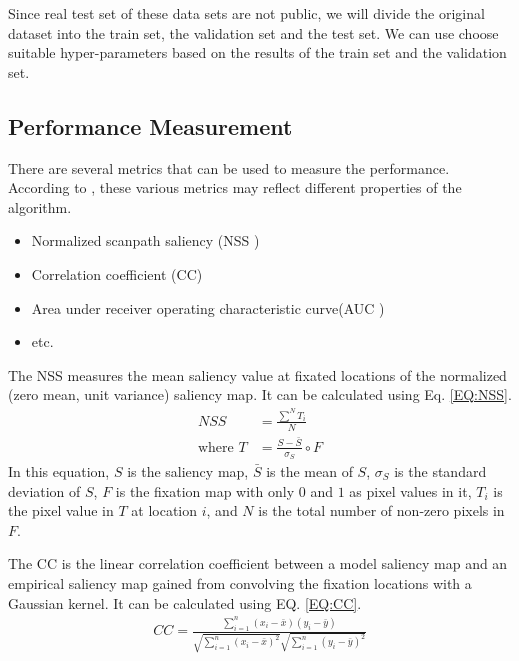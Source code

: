 \documentclass[12pt]{article}
\begin{document}
Since real test set of these data sets are not public, we will divide the original dataset into the train set, the validation set and the test set. We can use choose suitable hyper-parameters based on the results of the train set and the validation set.
\subsection{Performance Measurement}

There are several metrics that can be used to measure the performance. According to \cite{riche2013saliency}, these various metrics may reflect different properties of the algorithm.
\begin{itemize}
    \item Normalized scanpath saliency (NSS \cite{petersComponentsBottomupGaze2005})
    \item Correlation coefficient (CC)
    \item Area under receiver operating characteristic curve(AUC \cite{richeSaliencyHumanFixations2013})
    \item etc.
\end{itemize}

The NSS measures the mean saliency value at fixated locations of the normalized (zero mean, unit variance) saliency map. 
It can be calculated using Eq. \ref{EQ:NSS}. 
\begin{equation}
    \begin{aligned}
        NSS &= \frac{\sum^{N} T_{i}}{N}\\
        \text{where }T &= \frac{S - \bar{S}}{\sigma_{S}} \circ F
    \end{aligned}
    \label{EQ:NSS}
\end{equation}
In this equation, $S$ is the saliency map, $\bar{S}$ is the mean of $S$, $\sigma_{S}$ is 
the standard deviation of $S$, $F$ is the fixation map with only $0$ and $1$ as pixel values in it,
$T_{i}$ is the pixel value in $T$ at location $i$, and $N$ is the total number of non-zero pixels in $F$.

The CC is the linear correlation coefficient between a model saliency map and an empirical saliency map 
gained from convolving the fixation locations with a Gaussian kernel. It can be calculated using EQ. \ref{EQ:CC}. 
\begin{equation}
    \begin{aligned}
        CC = \frac{\sum_{i=1}^{n}(x_{i}-\bar{x})(y_{i}-\bar{y})}
        {\sqrt{\sum_{i=1}^{n}(x_{i}-\bar{x})^{2}}\sqrt{\sum_{i=1}^{n}(y_{i}-\bar{y})^{2}}}
    \end{aligned}
    \label{EQ:CC}
\end{equation}
\end{document}
